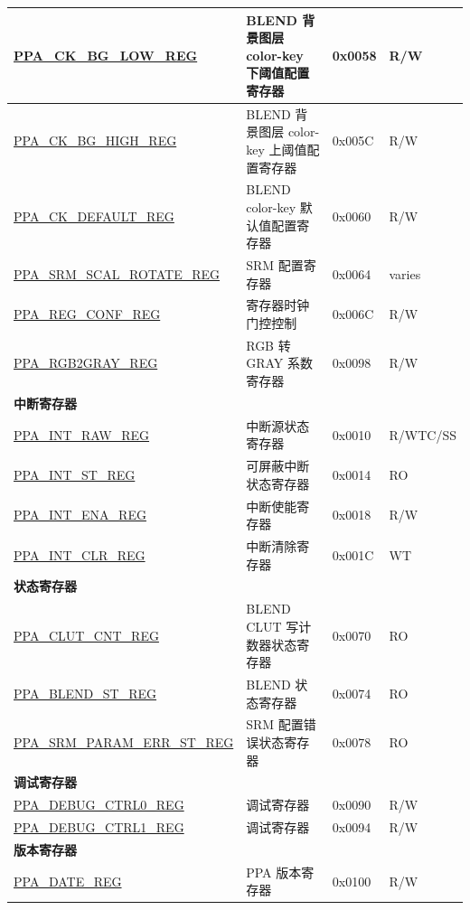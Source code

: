 \begin{longtable}{ | p{6cm} | p{7.2cm} | p{1.3cm} | p{1cm} | }
\hyperref[regdesc:PPACKBGLOWREG]{PPA\_CK\_BG\_LOW\_REG} & BLEND 背景图层 color-key 下阈值配置寄存器 & 0x0058 & R/W \\ \hline
\hyperref[regdesc:PPACKBGHIGHREG]{PPA\_CK\_BG\_HIGH\_REG} & BLEND 背景图层 color-key 上阈值配置寄存器 & 0x005C & R/W \\ \hline
\hyperref[regdesc:PPACKDEFAULTREG]{PPA\_CK\_DEFAULT\_REG} & BLEND color-key 默认值配置寄存器 & 0x0060 & R/W \\ \hline
\hyperref[regdesc:PPASRMSCALROTATEREG]{PPA\_SRM\_SCAL\_ROTATE\_REG} & SRM 配置寄存器 & 0x0064 & varies \\ \hline
\hyperref[regdesc:PPAREGCONFREG]{PPA\_REG\_CONF\_REG} & 寄存器时钟门控控制 & 0x006C & R/W \\ \hline
\hyperref[regdesc:PPARGB2GRAYREG]{PPA\_RGB2GRAY\_REG} & RGB 转 GRAY 系数寄存器 & 0x0098 & R/W \\ \hline

\multicolumn{4}{|l|}{\textbf{中断寄存器}} \\ \hline
\hyperref[regdesc:PPAINTRAWREG]{PPA\_INT\_RAW\_REG} & 中断源状态寄存器 & 0x0010 & R/WTC/SS \\ \hline
\hyperref[regdesc:PPAINTSTREG]{PPA\_INT\_ST\_REG} & 可屏蔽中断状态寄存器 & 0x0014 & RO \\ \hline
\hyperref[regdesc:PPAINTENAREG]{PPA\_INT\_ENA\_REG} & 中断使能寄存器 & 0x0018 & R/W \\ \hline
\hyperref[regdesc:PPAINTCLRREG]{PPA\_INT\_CLR\_REG} & 中断清除寄存器 & 0x001C & WT \\ \hline
\multicolumn{4}{|l|}{\textbf{状态寄存器}} \\ \hline
\hyperref[regdesc:PPACLUTCNTREG]{PPA\_CLUT\_CNT\_REG} & BLEND CLUT 写计数器状态寄存器 & 0x0070 & RO \\ \hline
\hyperref[regdesc:PPABLENDSTREG]{PPA\_BLEND\_ST\_REG} & BLEND 状态寄存器 & 0x0074 & RO \\ \hline
\hyperref[regdesc:PPASRMPARAMERRSTREG]{PPA\_SRM\_PARAM\_ERR\_ST\_REG} & SRM 配置错误状态寄存器 & 0x0078 & RO \\ \hline

\multicolumn{4}{|l|}{\textbf{调试寄存器}} \\ \hline
\hyperref[regdesc:PPADEBUGCTRL0REG]{PPA\_DEBUG\_CTRL0\_REG} & 调试寄存器 & 0x0090 & R/W \\ \hline
\hyperref[regdesc:PPADEBUGCTRL1REG]{PPA\_DEBUG\_CTRL1\_REG} & 调试寄存器 & 0x0094 & R/W \\ \hline
\multicolumn{4}{|l|}{\textbf{版本寄存器}} \\ \hline
\hyperref[regdesc:PPADATEREG]{PPA\_DATE\_REG} & PPA 版本寄存器 & 0x0100 & R/W \\ \hline
\end{longtable}
